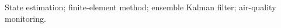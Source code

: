 \documentclass[journal]{IEEEtran}
\begin{document}
\begin{IEEEkeywords}
State estimation; finite-element method; ensemble Kalman filter; air-quality monitoring. 
\end{IEEEkeywords}






%
\IEEEpeerreviewmaketitle
\end{document}
